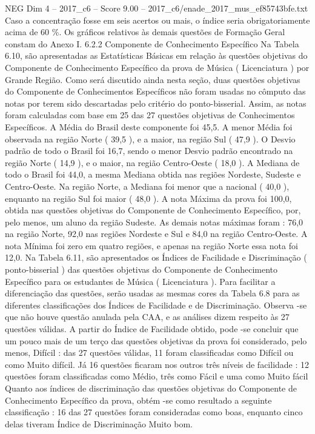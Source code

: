 \begin{textsample}{NEG Dim 4 – 2017\_c6 – Score 9.00 – 2017\_c6/enade\_2017\_mus\_ef85743bfe.txt}
Caso a concentração fosse em seis acertos ou mais, o índice seria obrigatoriamente acima de 60 \%.
Os gráficos relativos às demais questões de Formação Geral constam do Anexo I. 6.2.2 Componente de Conhecimento Específico Na Tabela 6.10, são apresentadas as Estatísticas Básicas em relação às questões objetivas do Componente de Conhecimento Específico da prova de Música ( Licenciatura ) por Grande Região.
Como será discutido ainda nesta seção, duas questões objetivas do Componente de Conhecimentos Específicos não foram usadas no cômputo das notas por terem sido descartadas pelo critério do ponto-bisserial.
Assim, as notas foram calculadas com base em 25 das 27 questões objetivas de Conhecimentos Específicos.
A Média do Brasil deste componente foi 45,5.
A menor Média foi observada na região Norte ( 39,5 ), e a maior, na região Sul ( 47,9 ).
O Desvio padrão de todo o Brasil foi 16,7, sendo o menor Desvio padrão encontrado na região Norte ( 14,9 ), e o maior, na região Centro-Oeste ( 18,0 ).
A Mediana de todo o Brasil foi 44,0, a mesma Mediana obtida nas regiões Nordeste, Sudeste e Centro-Oeste.
Na região Norte, a Mediana foi menor que a nacional ( 40,0 ), enquanto na região Sul foi maior ( 48,0 ).
A nota Máxima da prova foi 100,0, obtida nas questões objetivas do Componente de Conhecimento Específico, por, pelo menos, um aluno da região Sudeste.
As demais notas máximas foram : 76,0 na região Norte, 92,0 nas regiões Nordeste e Sul e 84,0 na região Centro-Oeste.
A nota Mínima foi zero em quatro regiões, e apenas na região Norte essa nota foi 12,0.
Na Tabela 6.11, são apresentados os Índices de Facilidade e Discriminação ( ponto-bisserial ) das questões objetivas do Componente de Conhecimento Específico para os estudantes de Música ( Licenciatura ).
Para facilitar a diferenciação das questões, serão usadas as mesmas cores da Tabela 6.8 para as diferentes classificações dos Índices de Facilidade e de Discriminação.
Observa -se que não houve questão anulada pela CAA, e as análises dizem respeito às 27 questões válidas.
A partir do Índice de Facilidade obtido, pode -se concluir que um pouco mais de um terço das questões objetivas da prova foi considerado, pelo menos, Difícil : das 27 questões válidas, 11 foram classificadas como Difícil ou como Muito difícil.
Já 16 questões ficaram nos outros três níveis de facilidade : 12 questões foram classificadas como Médio, três como Fácil e uma como Muito fácil Quanto aos índices de discriminação das questões objetivas do Componente de Conhecimento Específico da prova, obtém -se como resultado a seguinte classificação : 16 das 27 questões foram consideradas como boas, enquanto cinco delas tiveram Índice de Discriminação Muito bom.

\end{textsample}

